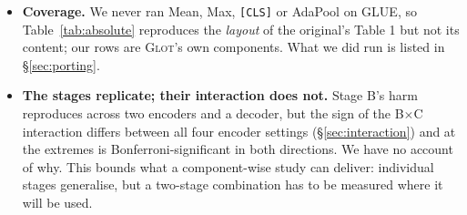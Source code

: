 \documentclass{article}
\begin{document}
\begin{itemize}
      minimum detectable effect of $2.06$ accuracy points exceeds every effect
      in that block, and no arm in it is significant. We include the column for
      completeness and base no conclusion on it. The decoder's RTE column is a
      different matter and carries its own caveat
      (Appendix~\ref{app:chance}).
\item \textbf{Coverage.} We never ran Mean, Max, \texttt{[CLS]} or AdaPool on
      GLUE, so Table~\ref{tab:absolute} reproduces the \emph{layout} of the
      original's Table 1 but not its content; our rows are \textsc{Glot}'s own
      components. What we did run is listed in \S\ref{sec:porting}.
\item \textbf{The stages replicate; their interaction does not.} Stage B's harm
      reproduces across two encoders and a decoder, but the sign of the
      B$\times$C interaction differs between all four encoder settings
      (\S\ref{sec:interaction}) and at the extremes is Bonferroni-significant in
      both directions. We have no account of why. This bounds what a
      component-wise study can deliver: individual stages generalise, but a
      two-stage combination has to be measured where it will be used.
\end{itemize}
\end{document}
